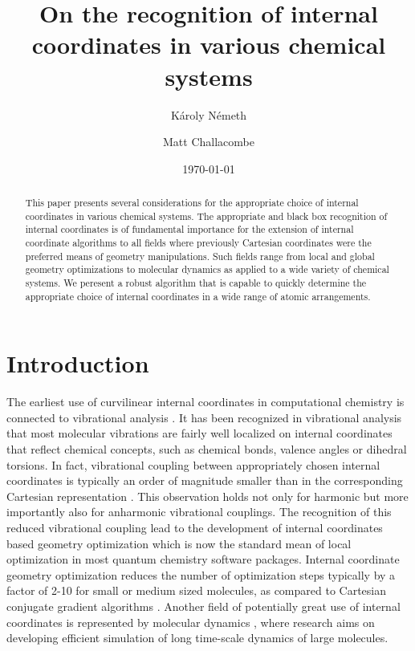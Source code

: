 \documentclass[prl,aps,preprint,superbib,12pt]{revtex4}
\begin{document}
\title{On the recognition of internal coordinates in various 
chemical systems}


\author{K\'aroly N\'emeth\footnotemark[1]}
\author{Matt Challacombe}


\date{\today}

\begin{abstract}
This paper presents several considerations for the appropriate choice 
of internal coordinates in various chemical systems. The appropriate
and black box recognition of internal coordinates is of fundamental 
importance
for the extension of internal coordinate algorithms to all fields where
previously Cartesian coordinates were the preferred means of geometry 
manipulations. Such fields range from local and global geometry 
optimizations to molecular dynamics as applied to a wide variety of
chemical systems. We peresent a robust algorithm that is capable 
to quickly determine the appropriate choice of internal coordinates
in a wide range of atomic arrangements.
\end{abstract}


\maketitle


\section{Introduction}
The earliest use of curvilinear internal coordinates 
in computational chemistry
is connected to vibrational analysis \cite{EWilson55}. 
It has been recognized in vibrational analysis 
that most molecular vibrations
are fairly well localized on internal coordinates that reflect
chemical concepts, such as chemical bonds, valence angles or
dihedral torsions. In fact, vibrational coupling between
appropriately chosen internal coordinates is typically
an order of magnitude smaller than in the corresponding Cartesian
representation \cite{PPulay69,GFogarasi79,GFogarasi92,PPulay77}.
This observation holds not only for harmonic but more importantly
also for anharmonic vibrational couplings.
The recognition of this reduced vibrational coupling lead to the
development of internal coordinates based geometry optimization
\cite{PPulay69,PPulay77,GFogarasi79,HSchlegel82,HSchlegel03} which
is now the standard mean of local optimization in most quantum
chemistry software packages. Internal coordinate geometry optimization
reduces the number of optimization steps typically by a factor of 2-10
for small or medium sized molecules, as compared to Cartesian
conjugate gradient algorithms \cite{TBucko05}. Another field of
potentially great use of internal coordinates is represented
by molecular dynamics \cite{PPulay02}, where research aims on developing
efficient simulation of long time-scale dynamics of large molecules.
\end{document}
